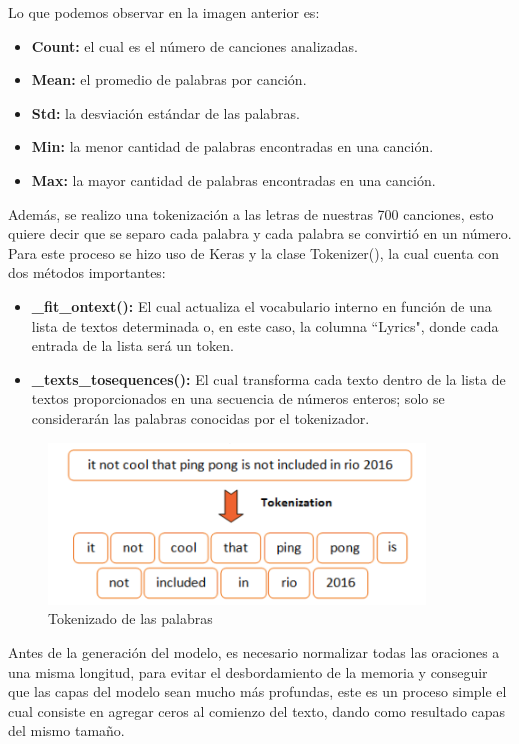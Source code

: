 \documentclass[12pt, a4paper, titlepage]{report}
\begin{document}
Lo que podemos observar en la imagen anterior es:
\begin{itemize}
	\item \textbf{Count:} el cual es el número de canciones analizadas.
	\item \textbf{Mean:} el promedio de palabras por canción.
	\item \textbf{Std:} la desviación estándar de las palabras.
	\item \textbf{Min:} la menor cantidad de palabras encontradas en una canción.
	\item \textbf{Max:} la mayor cantidad de palabras encontradas en una canción.
\end{itemize}
Además, se realizo una tokenización a las letras de nuestras 700 canciones, esto quiere decir que se separo cada palabra y cada palabra se convirtió en un número. Para este proceso se hizo uso de Keras y la clase Tokenizer(), la cual cuenta con dos métodos importantes:
\begin{itemize}
	\item \textbf{\_fit\_ontext():} El cual actualiza el vocabulario interno en función de una lista de textos determinada o, en este caso, la columna ``Lyrics", donde cada entrada de la lista será un token.
	\item \textbf{\_texts\_tosequences():} El cual transforma cada texto dentro de la lista de textos proporcionados en una secuencia de números enteros; solo se considerarán las palabras conocidas por el tokenizador.
\end{itemize}	
\begin{figure}[H]
	\includegraphics[width=10cm]{./imagenes/Desarrollo/Kaggle/tokenization.png}
	\centering 
	\caption{Tokenizado de las palabras \cite{tokenimagen}}
\end{figure}
Antes de la generación del modelo, es necesario normalizar todas las oraciones a una misma longitud, para evitar el desbordamiento de la memoria y conseguir que las capas del modelo sean mucho más profundas, este es un proceso simple el cual consiste en agregar ceros al comienzo del texto, dando como resultado capas del mismo tamaño.\\\\
\end{document}
